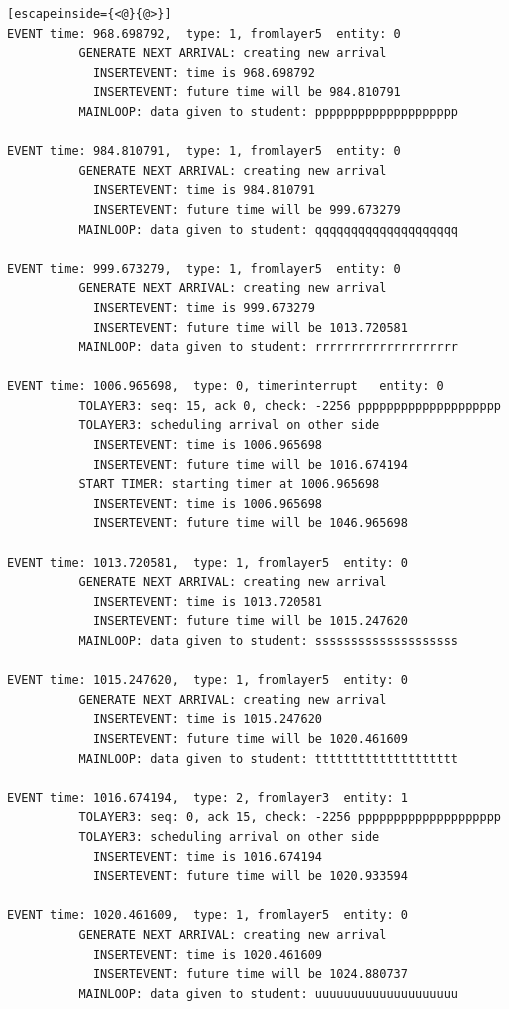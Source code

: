 \documentclass[paper=a4, fontsize=11pt]{scrartcl}
\numberwithin{equation}{section}		%
\numberwithin{figure}{section}			%
\numberwithin{table}{section}				%
\begin{document}
\begin{lstlisting}[escapeinside={<@}{@>}]
EVENT time: 968.698792,  type: 1, fromlayer5  entity: 0
          GENERATE NEXT ARRIVAL: creating new arrival
            INSERTEVENT: time is 968.698792
            INSERTEVENT: future time will be 984.810791
          MAINLOOP: data given to student: pppppppppppppppppppp

EVENT time: 984.810791,  type: 1, fromlayer5  entity: 0
          GENERATE NEXT ARRIVAL: creating new arrival
            INSERTEVENT: time is 984.810791
            INSERTEVENT: future time will be 999.673279
          MAINLOOP: data given to student: qqqqqqqqqqqqqqqqqqqq

EVENT time: 999.673279,  type: 1, fromlayer5  entity: 0
          GENERATE NEXT ARRIVAL: creating new arrival
            INSERTEVENT: time is 999.673279
            INSERTEVENT: future time will be 1013.720581
          MAINLOOP: data given to student: rrrrrrrrrrrrrrrrrrrr

EVENT time: 1006.965698,  type: 0, timerinterrupt   entity: 0
          TOLAYER3: seq: 15, ack 0, check: -2256 pppppppppppppppppppp
          TOLAYER3: scheduling arrival on other side
            INSERTEVENT: time is 1006.965698
            INSERTEVENT: future time will be 1016.674194
          START TIMER: starting timer at 1006.965698
            INSERTEVENT: time is 1006.965698
            INSERTEVENT: future time will be 1046.965698

EVENT time: 1013.720581,  type: 1, fromlayer5  entity: 0
          GENERATE NEXT ARRIVAL: creating new arrival
            INSERTEVENT: time is 1013.720581
            INSERTEVENT: future time will be 1015.247620
          MAINLOOP: data given to student: ssssssssssssssssssss

EVENT time: 1015.247620,  type: 1, fromlayer5  entity: 0
          GENERATE NEXT ARRIVAL: creating new arrival
            INSERTEVENT: time is 1015.247620
            INSERTEVENT: future time will be 1020.461609
          MAINLOOP: data given to student: tttttttttttttttttttt

EVENT time: 1016.674194,  type: 2, fromlayer3  entity: 1
          TOLAYER3: seq: 0, ack 15, check: -2256 pppppppppppppppppppp
          TOLAYER3: scheduling arrival on other side
            INSERTEVENT: time is 1016.674194
            INSERTEVENT: future time will be 1020.933594

EVENT time: 1020.461609,  type: 1, fromlayer5  entity: 0
          GENERATE NEXT ARRIVAL: creating new arrival
            INSERTEVENT: time is 1020.461609
            INSERTEVENT: future time will be 1024.880737
          MAINLOOP: data given to student: uuuuuuuuuuuuuuuuuuuu


\end{lstlisting}
\end{document}
